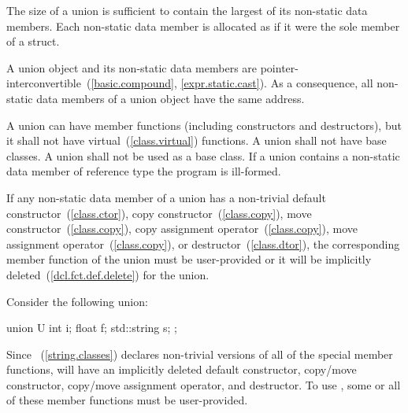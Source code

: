 \pnum
The size of a union is sufficient to contain the largest
of its non-static data members. Each non-static data member is allocated
as if it were the sole member of a struct.
\begin{note}
A union object and its non-static data members are
pointer-interconvertible~(\ref{basic.compound}, \ref{expr.static.cast}).
As a consequence, all non-static data members of a
union object have the same address.
\end{note}

\pnum
{}%
%
%
A union can have member functions (including constructors and destructors),
%
but it shall not have virtual~(\ref{class.virtual}) functions. A union shall not have
base classes. A union shall not be used as a base class.
%
If a union contains a non-static data member of
reference type the program is ill-formed.
\begin{note} If any non-static data member of a union has a non-trivial
default constructor~(\ref{class.ctor}),
copy constructor~(\ref{class.copy}),
move constructor~(\ref{class.copy}),
copy assignment operator~(\ref{class.copy}),
move assignment operator~(\ref{class.copy}),
or destructor~(\ref{class.dtor}), the corresponding member function
of the union must be user-provided or it will
be implicitly deleted~(\ref{dcl.fct.def.delete}) for the union. \end{note}

\pnum
\begin{example} Consider the following union:

\begin{codeblock}
union U {
  int i;
  float f;
  std::string s;
};
\end{codeblock}

Since ~(\ref{string.classes}) declares non-trivial versions of all of the special
member functions,  will have an implicitly deleted default constructor,
copy/move constructor,
copy/move assignment operator, and destructor.
To use , some or all of these member functions
must be user-provided.\end{example}


